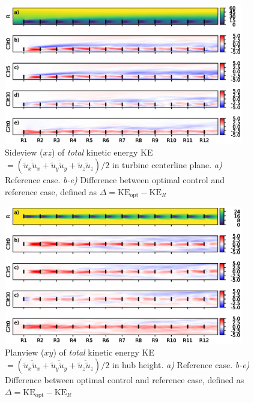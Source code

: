 		\begin{figure}[ht]
			\centering
			\includegraphics[width=0.93\textwidth]{chapters/optimal_induction_control/sideview_ke_total_side.eps}
			\caption[Sideview ($xz$) of \emph{total} kinetic energy KE $= (\overline{\widetilde{u}_x \widetilde{u}_x} + \overline{\widetilde{u}_y \widetilde{u}_y} + \overline{\widetilde{u}_z \widetilde{u}_z})/2$ in turbine centerline plane.]{Sideview ($xz$) of \emph{total} kinetic energy KE $= (\overline{\widetilde{u}_x \widetilde{u}_x} + \overline{\widetilde{u}_y \widetilde{u}_y} + \overline{\widetilde{u}_z \widetilde{u}_z})/2$ in turbine centerline plane. \emph{a) } Reference case. \emph{b-e)} Difference between optimal control and reference case, defined as $\Delta = \text{KE}_{\text{opt}} - \text{KE}_{R}$  \label{fig:opt_ind_side_total_ke}}
		\end{figure}

		\begin{figure}[hbt]
			\centering
			\includegraphics[width=0.93\textwidth]{chapters/optimal_induction_control/topview_ke_total.eps}
			\caption[Planview ($xy$) of \emph{total} kinetic energy KE $= (\overline{\widetilde{u}_x \widetilde{u}_x} +
			\overline{\widetilde{u}_y \widetilde{u}_y} + \overline{\widetilde{u}_z \widetilde{u}_z})/2$ in hub height.]{Planview ($xy$) of \emph{total} kinetic energy KE $= (\overline{\widetilde{u}_x \widetilde{u}_x} +
			\overline{\widetilde{u}_y \widetilde{u}_y} + \overline{\widetilde{u}_z \widetilde{u}_z})/2$ in hub height. \emph{a) } Reference case. \emph{b-e)} Difference between optimal control and reference case, defined as $\Delta = \text{KE}_{\text{opt}} - \text{KE}_{R}$  \label{fig:opt_ind_top_total_ke}}
		\end{figure}
	
